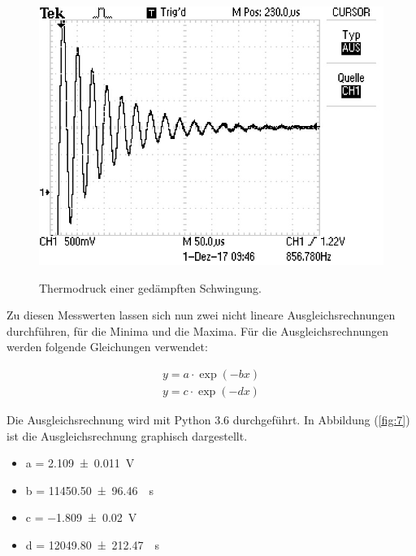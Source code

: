 \begin{figure}[H]
  \centering
  \caption{Thermodruck einer gedämpften Schwingung.}
  \includegraphics[width=\textwidth]{Kurve.jpg}
  \label{fig:6}
\end{figure}

Zu diesen Messwerten lassen sich nun zwei nicht lineare Ausgleichsrechnungen durchführen,
für die Minima und die Maxima. Für die Ausgleichsrechnungen werden folgende Gleichungen
verwendet:

\begin{gather*}
  y = a \cdot \exp(-bx) \\
  y = c \cdot \exp(-dx)
\end{gather*}

Die Ausgleichsrechnung wird mit Python 3.6 durchgeführt. In Abbildung (\ref{fig:7})
ist die Ausgleichsrechnung graphisch dargestellt.

\begin{itemize}
  \item a = \SI{2.109(11)}{\V}
  \item b = \SI{11450.50(9646)}{\per\second}
  \item c = \SI{-1.809(20)}{\V}
  \item d = \SI{12049.80(21247)}{\per\second}
\end{itemize}

